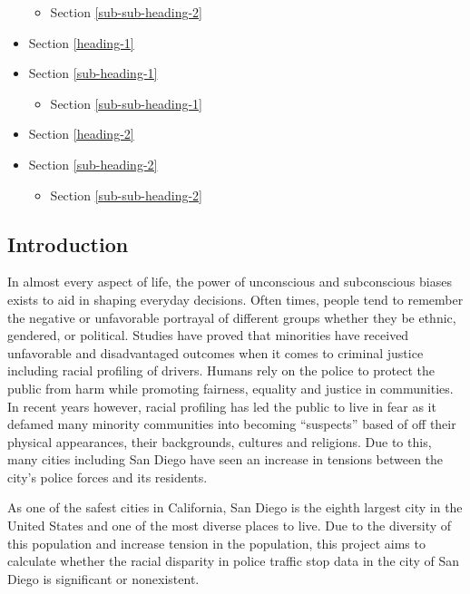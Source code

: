 \documentclass[11pt]{article}
\providecommand{\tightlist}{%
      \setlength{\itemsep}{0pt}\setlength{\parskip}{0pt}}
\begin{document}
\begin{itemize}
  \begin{itemize}
  \tightlist
  \item
    Section \ref{sub-sub-heading-2}
  \end{itemize}
\item
  Section \ref{heading-1}
\item
  Section \ref{sub-heading-1}

  \begin{itemize}
  \tightlist
  \item
    Section \ref{sub-sub-heading-1}
  \end{itemize}
\item
  Section \ref{heading-2}
\item
  Section \ref{sub-heading-2}

  \begin{itemize}
  \tightlist
  \item
    Section \ref{sub-sub-heading-2}
  \end{itemize}
\end{itemize}

    \subsection{Introduction}\label{introduction}

    In almost every aspect of life, the power of unconscious and
subconscious biases exists to aid in shaping everyday decisions. Often
times, people tend to remember the negative or unfavorable portrayal of
different groups whether they be ethnic, gendered, or political. Studies
have proved that minorities have received unfavorable and disadvantaged
outcomes when it comes to criminal justice including racial profiling of
drivers. Humans rely on the police to protect the public from harm while
promoting fairness, equality and justice in communities. In recent years
however, racial profiling has led the public to live in fear as it
defamed many minority communities into becoming ``suspects'' based of
off their physical appearances, their backgrounds, cultures and
religions. Due to this, many cities including San Diego have seen an
increase in tensions between the city's police forces and its residents.

    As one of the safest cities in California, San Diego is the eighth
largest city in the United States and one of the most diverse places to
live. Due to the diversity of this population and increase tension in
the population, this project aims to calculate whether the racial
disparity in police traffic stop data in the city of San Diego is
significant or nonexistent.
\end{document}
